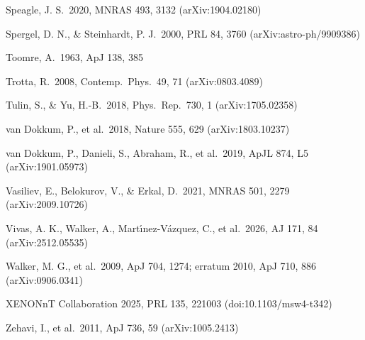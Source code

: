 \documentclass[
  10pt,
]{article}
\begin{document}
{\begin{list}{}{\setlength{\leftmargin}{1.5em}\setlength{\itemindent}{-1.5em}\setlength{\itemsep}{1pt}\setlength{\parsep}{0pt}}
\item Speagle, J. S.\ 2020, MNRAS 493, 3132 (arXiv:1904.02180)
\item Spergel, D. N., \& Steinhardt, P. J.\ 2000, PRL 84, 3760 (arXiv:astro-ph/9909386)
\item Toomre, A.\ 1963, ApJ 138, 385
\item Trotta, R.\ 2008, Contemp.\ Phys.\ 49, 71 (arXiv:0803.4089)
\item Tulin, S., \& Yu, H.-B.\ 2018, Phys.\ Rep.\ 730, 1 (arXiv:1705.02358)
\item van Dokkum, P., et al.\ 2018, Nature 555, 629 (arXiv:1803.10237)
\item van Dokkum, P., Danieli, S., Abraham, R., et al.\ 2019, ApJL 874, L5 (arXiv:1901.05973)
\item Vasiliev, E., Belokurov, V., \& Erkal, D.\ 2021, MNRAS 501, 2279 (arXiv:2009.10726)
\item Vivas, A. K., Walker, A., Mart\'{\i}nez-V\'azquez, C., et al.\ 2026, AJ 171, 84 (arXiv:2512.05535)
\item Walker, M. G., et al.\ 2009, ApJ 704, 1274; erratum 2010, ApJ 710, 886 (arXiv:0906.0341)
\item XENONnT Collaboration 2025, PRL 135, 221003 (doi:10.1103/msw4-t342)
\item Zehavi, I., et al.\ 2011, ApJ 736, 59 (arXiv:1005.2413)
\end{list}}
\end{document}
